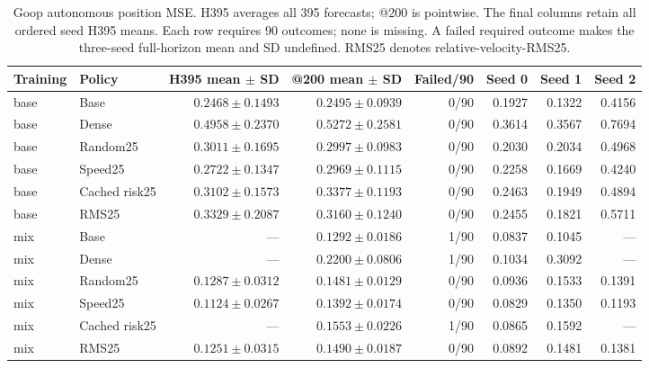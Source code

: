 \begin{table}[t]
\centering\scriptsize
\caption{Goop autonomous position MSE. H395 averages all 395 forecasts; @200 is pointwise. The final columns retain all ordered seed H395 means. Each row requires 90 outcomes; none is missing. A failed required outcome makes the three-seed full-horizon mean and SD undefined. RMS25 denotes relative-velocity-RMS25.}
\label{tab:goop-all-rollouts}
\begin{tabular}{llrrrrrr}
\toprule
Training & Policy & H395 mean $\pm$ SD & @200 mean $\pm$ SD & Failed/90 & Seed 0 & Seed 1 & Seed 2\\
\midrule
base & Base & $0.2468\pm0.1493$ & $0.2495\pm0.0939$ & 0/90 & 0.1927 & 0.1322 & 0.4156\\
base & Dense & $0.4958\pm0.2370$ & $0.5272\pm0.2581$ & 0/90 & 0.3614 & 0.3567 & 0.7694\\
base & Random25 & $0.3011\pm0.1695$ & $0.2997\pm0.0983$ & 0/90 & 0.2030 & 0.2034 & 0.4968\\
base & Speed25 & $0.2722\pm0.1347$ & $0.2969\pm0.1115$ & 0/90 & 0.2258 & 0.1669 & 0.4240\\
base & Cached risk25 & $0.3102\pm0.1573$ & $0.3377\pm0.1193$ & 0/90 & 0.2463 & 0.1949 & 0.4894\\
base & RMS25 & $0.3329\pm0.2087$ & $0.3160\pm0.1240$ & 0/90 & 0.2455 & 0.1821 & 0.5711\\
\midrule
mix & Base & --- & $0.1292\pm0.0186$ & 1/90 & 0.0837 & 0.1045 & ---\\
mix & Dense & --- & $0.2200\pm0.0806$ & 1/90 & 0.1034 & 0.3092 & ---\\
mix & Random25 & $0.1287\pm0.0312$ & $0.1481\pm0.0129$ & 0/90 & 0.0936 & 0.1533 & 0.1391\\
mix & Speed25 & $0.1124\pm0.0267$ & $0.1392\pm0.0174$ & 0/90 & 0.0829 & 0.1350 & 0.1193\\
mix & Cached risk25 & --- & $0.1553\pm0.0226$ & 1/90 & 0.0865 & 0.1592 & ---\\
mix & RMS25 & $0.1251\pm0.0315$ & $0.1490\pm0.0187$ & 0/90 & 0.0892 & 0.1481 & 0.1381\\
\bottomrule
\end{tabular}
\end{table}

